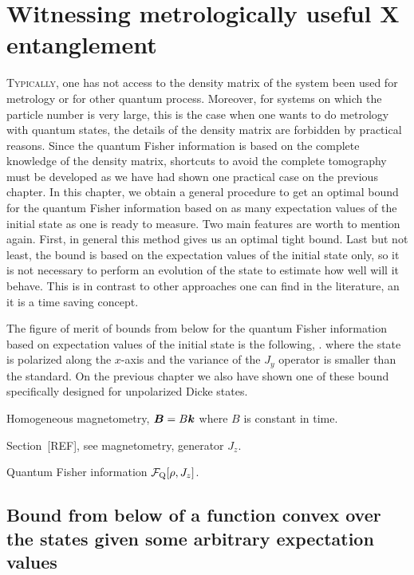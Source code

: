 \section[Witnessing metrologically useful entanglement]
{Witnessing metrologically useful {\color{grey} X} entanglement}



\lettrine[lines=2, findent=3pt,nindent=0pt]{T}{ypically}, one has not access to the density matrix of the system been used for metrology or for other quantum process.
Moreover, for systems on which the particle number is very large, this is the case when one wants to do metrology with quantum states, the details of the density matrix are forbidden by practical reasons.
Since the quantum Fisher information is based on the complete knowledge of the density matrix, shortcuts to avoid the complete tomography must be developed as we have had shown one practical case on the previous chapter.
In this chapter, we obtain a general procedure to get an optimal bound for the quantum Fisher information based on as many expectation values of the initial state as one is ready to measure.
Two main features are worth to mention again.
First, in general this method gives us an optimal tight bound.
Last but not least, the bound is based on the expectation values of the initial state only, so it is not necessary to perform an evolution of the state to estimate how well will it behave.
This is in contrast to other approaches one can find in the literature, an it is a time saving concept.

The figure of merit of bounds from below for the quantum Fisher information based on expectation values of the initial state is the following,
\be
  \qfi [\rho,J_z] \geq {}.
\ee
where the state is polarized along the $x$-axis and the variance of the $J_y$ operator is smaller than the standard.
On the previous chapter we also have shown one of these bound specifically designed for unpolarized Dicke states.

Homogeneous magnetometry, $\boldsymbol{B} = B\boldsymbol{k}$ where $B$ is constant in time.

Section~[REF], see magnetometry, generator $J_z$.

Quantum Fisher information $\mathcal{F}_{\text{Q}} [\rho, J_z]$.

\subsection{Bound from below of a function convex over the states given some arbitrary expectation values}

